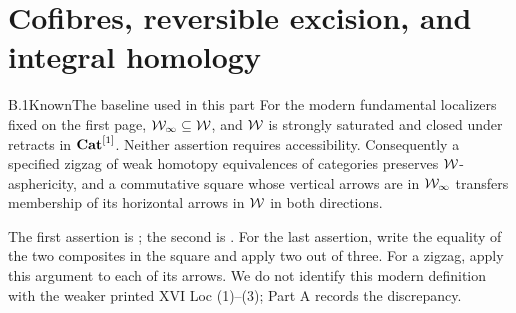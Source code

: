 \section{Cofibres, reversible excision, and integral homology}

\begin{claim}{B.1}{Known}{The baseline used in this part}
For the modern fundamental localizers fixed on the first page, $\mathcal{W}_{\infty}\subseteq\mathcal{W}$, and $\mathcal{W}$ is strongly saturated and closed under retracts in $\mathbf{Cat}^{[1]}$. Neither assertion requires accessibility. Consequently a specified zigzag of weak homotopy equivalences of categories preserves $\mathcal{W}$-asphericity, and a commutative square whose vertical arrows are in $\mathcal{W}_{\infty}$ transfers membership of its horizontal arrows in $\mathcal{W}$ in both directions.
\end{claim}
The first assertion is \citet[Theorem 2.2.11, p.~136]{RootCisinski2004}; the second is \citet[Proposition 4.2.4, p.~183]{RootCisinski2006}. For the last assertion, write the equality of the two composites in the square and apply two out of three. For a zigzag, apply this argument to each of its arrows. We do not identify this modern definition with the weaker printed XVI Loc (1)--(3); Part A records the discrepancy.

